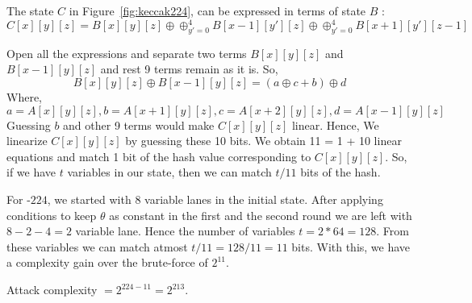 The state $C$ in Figure~\ref{fig:keccak224}, can be expressed in terms of state $B$ :
\[
C[x][y][z] = B[x][y][z] \oplus \oplus_{y' = 0}^{4} B[x-1][y'][z] \oplus \oplus_{y' = 0}^{4} B[x+1][y'][z-1]
\]

Open all the expressions and separate two terms $B[x][y][z]$ and $B[x-1][y][z]$ and rest 9 terms remain as it is.
So, \[ B[x][y][z] \oplus B[x-1][y][z] = (a \oplus c + b) \oplus d
\]
Where,
\[
a = A[x][y][z], b = A[x + 1][y][z], c = A[x + 2][y][z], d = A[x - 1][y][z]
\]
Guessing $b$ and other 9 terms would make $C[x][y][z]$ linear. Hence, We linearize $C[x][y][z]$ by guessing these 10 bits. We obtain 11 = 1 + 10 linear equations and match 1 bit of the hash value corresponding to $C[x][y][z]$. So, if we have $t$ variables in our state, then we can match $t/11$ bits of the hash.

For \Keccak-$224$, we started with $8$ variable lanes in the initial state. After applying conditions to keep $\theta$ as constant in the first and the second round we are left with $8 - 2 - 4 = 2$ variable lane. Hence the number of variables $t = 2*64 = 128$. From these variables we can match atmost $t/11 = 128/11 = 11$ bits. 
With this, we have a complexity gain over the brute-force of $2^{11}$.

Attack complexity $ = 2^{224 - 11} = 2^{213}$.